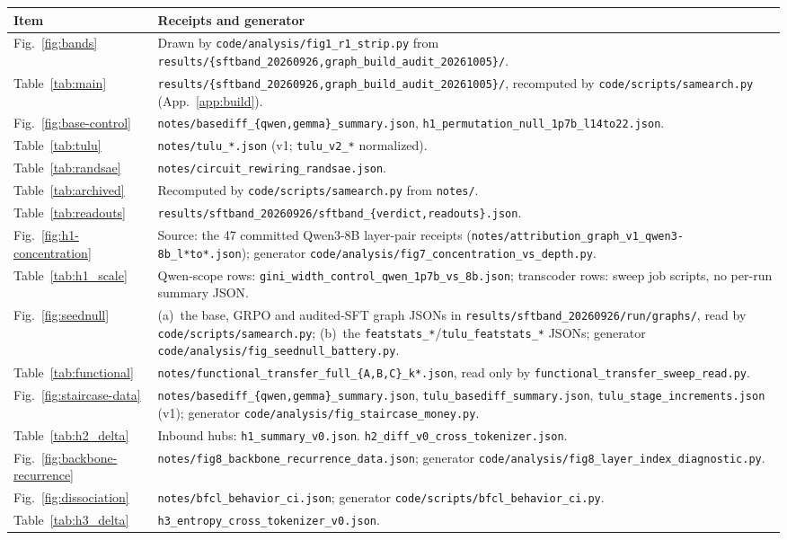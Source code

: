 \documentclass{article}
\begin{document}
{\small\begin{longtable}{@{}p{}>{\raggedright\arraybackslash}p{}@{}}
\toprule Item & Receipts and generator \\ \midrule
\endhead
Fig.~\ref{fig:bands} & Drawn by \texttt{code/analysis/fig1\_r1\_strip.py} from \texttt{results/\{sftband\_20260926,graph\_build\_audit\_20261005\}/}. \\
Table~\ref{tab:main} & \texttt{results/\{sftband\_20260926,graph\_build\_audit\_20261005\}/}, recomputed by \texttt{code/scripts/samearch.py} (App.~\ref{app:build}). \\
Fig.~\ref{fig:base-control} & \texttt{notes/basediff\_\{qwen,gemma\}\_summary.json}, \texttt{h1\_permutation\_null\_1p7b\_l14to22.json}. \\
Table~\ref{tab:tulu} & \texttt{notes/tulu\_*.json} (v1; \texttt{tulu\_v2\_*} normalized). \\
Table~\ref{tab:randsae} & \texttt{notes/circuit\_rewiring\_randsae.json}. \\
Table~\ref{tab:archived} & Recomputed by \texttt{code/scripts/samearch.py} from \texttt{notes/}. \\
Table~\ref{tab:readouts} & \texttt{results/sftband\_20260926/sftband\_\{verdict,readouts\}.json}. \\
Fig.~\ref{fig:h1-concentration} & Source: the 47 committed Qwen3-8B layer-pair receipts (\texttt{notes/attribution\_graph\_v1\_qwen3-8b\_l*to*.json}); generator \texttt{code/analysis/fig7\_concentration\_vs\_depth.py}. \\
Table~\ref{tab:h1_scale} & Qwen-scope rows: \texttt{gini\_width\_control\_qwen\_1p7b\_vs\_8b.json}; transcoder rows: sweep job scripts, no per-run summary JSON. \\
Fig.~\ref{fig:seednull} & (a)~the base, GRPO and audited-SFT graph JSONs in \texttt{results/sftband\_20260926/run/graphs/}, read by \texttt{code/scripts/samearch.py}; (b)~the \texttt{featstats\_*}/\texttt{tulu\_featstats\_*} JSONs; generator \texttt{code/analysis/fig\_seednull\_battery.py}. \\
Table~\ref{tab:functional} & \texttt{notes/functional\_transfer\_full\_\{A,B,C\}\_k*.json}, read only by \texttt{functional\_transfer\_sweep\_read.py}. \\
Fig.~\ref{fig:staircase-data} & \texttt{notes/basediff\_\{qwen,gemma\}\_summary.json}, \texttt{tulu\_basediff\_summary.json}, \texttt{tulu\_stage\_increments.json} (v1); generator \texttt{code/analysis/fig\_staircase\_money.py}. \\
Table~\ref{tab:h2_delta} & Inbound hubs: \texttt{h1\_summary\_v0.json}. \texttt{h2\_diff\_v0\_cross\_tokenizer.json}. \\
Fig.~\ref{fig:backbone-recurrence} & \texttt{notes/fig8\_backbone\_recurrence\_data.json}; generator \texttt{code/analysis/fig8\_layer\_index\_diagnostic.py}. \\
Fig.~\ref{fig:dissociation} & \texttt{notes/bfcl\_behavior\_ci.json}; generator \texttt{code/scripts/bfcl\_behavior\_ci.py}. \\
Table~\ref{tab:h3_delta} & \texttt{h3\_entropy\_cross\_tokenizer\_v0.json}. \\
\bottomrule
\end{longtable}}
\end{document}
